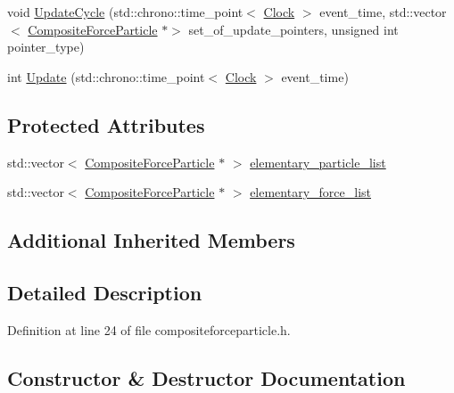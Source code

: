 \begin{DoxyCompactItemize}
\item 
void \hyperlink{class_composite_force_particle_a578d87e48246ef83f39dce070dff541e}{Update\+Cycle} (std\+::chrono\+::time\+\_\+point$<$ \hyperlink{universe_8h_a0ef8d951d1ca5ab3cfaf7ab4c7a6fd80}{Clock} $>$ event\+\_\+time, std\+::vector$<$ \hyperlink{class_composite_force_particle}{Composite\+Force\+Particle} $\ast$$>$ set\+\_\+of\+\_\+update\+\_\+pointers, unsigned int pointer\+\_\+type)
\item 
int \hyperlink{class_composite_force_particle_a69b47aaf17ab6faa396c2f6e6c85b2e3}{Update} (std\+::chrono\+::time\+\_\+point$<$ \hyperlink{universe_8h_a0ef8d951d1ca5ab3cfaf7ab4c7a6fd80}{Clock} $>$ event\+\_\+time)
\end{DoxyCompactItemize}
\subsection*{Protected Attributes}
\begin{DoxyCompactItemize}
\item 
std\+::vector$<$ \hyperlink{class_composite_force_particle}{Composite\+Force\+Particle} $\ast$ $>$ \hyperlink{class_composite_force_particle_a1f5ab59857b8517af69205178f04abe9}{elementary\+\_\+particle\+\_\+list}
\item 
std\+::vector$<$ \hyperlink{class_composite_force_particle}{Composite\+Force\+Particle} $\ast$ $>$ \hyperlink{class_composite_force_particle_a00d5ce181c8d4b1df0d46ff23a8fb1b8}{elementary\+\_\+force\+\_\+list}
\end{DoxyCompactItemize}
\subsection*{Additional Inherited Members}


\subsection{Detailed Description}


Definition at line 24 of file compositeforceparticle.\+h.



\subsection{Constructor \& Destructor Documentation}
\mbox{\label{class_composite_force_particle_ae00ad8621af6155c86ee3205c1e2afdb}} 
